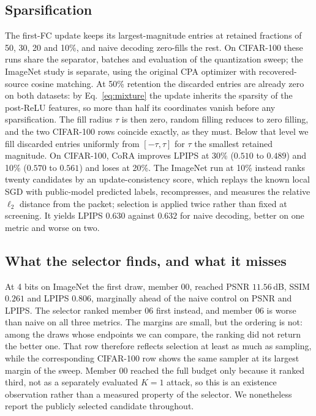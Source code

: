 \documentclass{article}
\newcommand{\cora}{CoRA}
\begin{document}
\subsection{Sparsification}
\label{sec:sparse}
The first-FC update keeps its largest-magnitude entries at retained fractions
of 50, 30, 20 and 10\%, and naive decoding zero-fills the rest. On CIFAR-100
these runs share the separator, batches and evaluation of the quantization
sweep; the ImageNet study is separate, using the original CPA optimizer with
recovered-source cosine matching. At 50\% retention the discarded entries are
already zero on both datasets: by Eq.~\eqref{eq:mixture} the update inherits
the sparsity of the post-ReLU features, so more than half its coordinates
vanish before any sparsification. The fill radius $\tau$ is then zero, random
filling reduces to zero filling, and the two CIFAR-100 rows coincide exactly,
as they must. Below that level we fill discarded entries uniformly from
$[-\tau,\tau]$ for $\tau$ the smallest retained magnitude. On CIFAR-100,
\cora{} improves LPIPS at 30\% ($0.510$ to $0.489$) and 10\% ($0.570$ to
$0.561$) and loses at 20\%. The ImageNet run at 10\% instead ranks twenty
candidates by an update-consistency score, which replays the known local SGD
with public-model predicted labels, recompresses, and measures the relative
$\ell_2$ distance from the packet; selection is applied twice rather than
fixed at screening. It yields LPIPS $0.630$ against $0.632$ for naive
decoding, better on one metric and worse on two.

\subsection{What the selector finds, and what it misses}
\label{sec:individual}
At 4 bits on ImageNet the first draw, member 00, reached PSNR $11.56$\,dB,
SSIM $0.261$ and LPIPS $0.806$, marginally ahead of the naive control on PSNR
and LPIPS. The selector ranked member 06 first instead, and member 06 is worse
than naive on all three metrics. The margins are small, but the ordering is
not: among the draws whose endpoints we can compare, the ranking did not
return the better one. That row therefore reflects selection at least as much
as sampling, while the corresponding CIFAR-100 row shows the same sampler at
its largest margin of the sweep. Member 00 reached the full budget only
because it ranked third, not as a separately evaluated $K=1$ attack, so this
is an existence observation rather than a measured property of the selector.
We nonetheless report the publicly selected candidate throughout.
\end{document}
